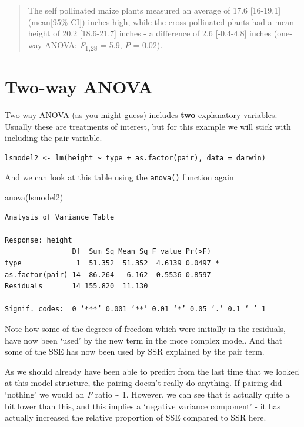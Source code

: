 \documentclass[
]{book}
\newenvironment{Shaded}{\begin{snugshade}}{\end{snugshade}}
\newcommand{\FunctionTok}[1]{\textcolor[rgb]{0.00,0.00,0.00}{#1}}
\newcommand{\NormalTok}[1]{#1}
\begin{document}
\begin{quote}
The self pollinated maize plants measured an average of 17.6 {[}16-19.1{]} (mean{[}95\% CI{]}) inches high, while the cross-pollinated plants had a mean height of 20.2 {[}18.6-21.7{]} inches - a difference of 2.6 {[}-0.4-4.8{]} inches (one-way ANOVA: \emph{F}\textsubscript{1,28} = 5.9, \emph{P} = 0.02).
\end{quote}

\hypertarget{two-way-anova}{%
\section{Two-way ANOVA}\label{two-way-anova}}

Two way ANOVA (as you might guess) includes \textbf{two} explanatory variables. Usually these are treatments of interest, but for this example we will stick with including the pair variable.

\begin{verbatim}
lsmodel2 <- lm(height ~ type + as.factor(pair), data = darwin)
\end{verbatim}

And we can look at this table using the \texttt{anova()} function again

\begin{Shaded}
\begin{Highlighting}[]
\FunctionTok{anova}\NormalTok{(lsmodel2)}
\end{Highlighting}
\end{Shaded}

\begin{verbatim}
Analysis of Variance Table

Response: height
                Df  Sum Sq Mean Sq F value Pr(>F)  
type             1  51.352  51.352  4.6139 0.0497 *
as.factor(pair) 14  86.264   6.162  0.5536 0.8597  
Residuals       14 155.820  11.130                 
---
Signif. codes:  0 ‘***’ 0.001 ‘**’ 0.01 ‘*’ 0.05 ‘.’ 0.1 ‘ ’ 1
\end{verbatim}

Note how some of the degrees of freedom which were initially in the residuals, have now been `used' by the new term in the more complex model. And that some of the SSE has now been used by SSR explained by the pair term.

As we should already have been able to predict from the last time that we looked at this model structure, the pairing doesn't really do anything. If pairing did `nothing' we would an \emph{F} ratio \textasciitilde{} 1. However, we can see that is actually quite a bit lower than this, and this implies a `negative variance component' - it has actually increased the relative proportion of SSE compared to SSR here.
\end{document}
